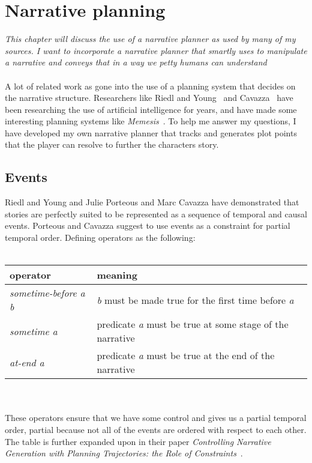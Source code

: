\chapter{Narrative planning}
\label{ch:planning}
\textit{This chapter will discuss the use of a narrative planner as used by many of my sources. I want to incorporate a narrative planner that smartly uses \diage to manipulate a narrative and conveys that in a way we petty humans can understand}
\\\\
A lot of related work as gone into the use of a planning system that decides on the narrative structure. Researchers like Riedl and Young~\cite{Riedl03character-focusednarrative}\cite{Riedl:2003:MIU:860575.860694}\cite{Riedl:2004:IPM:1018409.1018753} and Cavazza~\cite{Cavazza:2002:CIS:630325.630747} have been researching the use of artificial intelligence for years, and have made some interesting planning systems like \textit{Memesis}~\cite{young2003towards}. To help me answer my questions, I have developed my own narrative planner that tracks and generates plot points that the player can resolve to further the characters story.

\section{Events}
Riedl and Young\cite{Riedl:2004:IPM:1018409.1018753} and Julie Porteous and Marc Cavazza\cite{Porteous:2009:CNG:1695522.1695557} have demonstrated that stories are perfectly suited to be represented as a sequence of temporal and causal events. Porteous and Cavazza suggest to use events as a constraint for partial temporal order. Defining operators as the following:\\\\
\begin{tabular}{|l||l|}
\hline 
operator & meaning \\ 
\hline
\hline 
\textit{sometime-before a b} & \textit{b} must be made true for the first time before \textit{a} \\ 
\hline 
\textit{sometime a} & predicate \textit{a} must be true at some stage of the narrative \\ 
\hline 
\textit{at-end a} & predicate \textit{a} must be true at the end of the narrative \\ 
\hline 
\end{tabular} 
\\\\
These operators ensure that we have some control and gives us a partial temporal order, partial because not all of the events are ordered with respect to each other. The table is further expanded upon in their paper \textit{Controlling Narrative Generation with Planning Trajectories: the Role of Constraints}~\cite{Porteous:2009:CNG:1695522.1695557}.

